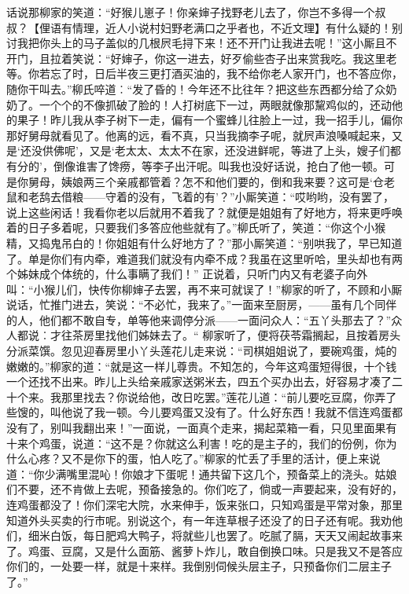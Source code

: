 \documentclass[12pt,oneside]{book}
\begin{document}
话说那柳家的笑道：“好猴儿崽子！你亲婶子找野老儿去了，你岂不多得一个叔叔？【俚语有情理，近人小说村妇野老满口之乎者也，不近文理】有什么疑的！别讨我把你头上的马子盖似的几根屄毛挦下来！还不开门让我进去呢！”这小厮且不开门，且拉着笑说：“好婶子，你这一进去，好歹偷些杏子出来赏我吃。我这里老等。你若忘了时，日后半夜三更打酒买油的，我不给你老人家开门，也不答应你，随你干叫去。”柳氏啐道︰“发了昏的！今年还不比往年？把这些东西都分给了众奶奶了。一个个的不像抓破了脸的！人打树底下一过，两眼就像那黧鸡似的，还动他的果子！昨儿我从李子树下一走，偏有一个蜜蜂儿往脸上一过，我一招手儿，偏你那好舅母就看见了。他离的远，看不真，只当我摘李子呢，就屄声浪嗓喊起来，又是‘还没供佛呢’，又是‘老太太、太太不在家，还没进鲜呢，等进了上头，嫂子们都有分的’，倒像谁害了馋痨，等李子出汗呢。叫我也没好话说，抢白了他一顿。可是你舅母，姨娘两三个亲戚都管着？怎不和他们要的，倒和我来要？这可是‘仓老鼠和老鸹去借粮——守着的没有，飞着的有’？”小厮笑道：“哎哟哟，没有罢了，说上这些闲话！我看你老以后就用不着我了？就便是姐姐有了好地方，将来更呼唤着的日子多着呢，只要我们多答应他些就有了。”柳氏听了，笑道：“你这个小猴精，又捣鬼吊白的！你姐姐有什么好地方了？”那小厮笑道：“别哄我了，早已知道了。单是你们有内牵，难道我们就没有内牵不成？我虽在这里听哈，里头却也有两个姊妹成个体统的，什么事瞒了我们！”
正说着，只听门内又有老婆子向外叫：“小猴儿们，快传你柳婶子去罢，再不来可就误了！”柳家的听了，不顾和小厮说话，忙推门进去，笑说：“不必忙，我来了。”一面来至厨房，——虽有几个同伴的人，他们都不敢自专，单等他来调停分派——一面问众人：“五丫头那去了？”众人都说︰才往茶房里找他们姊妹去了。“
柳家听了，便将茯苓霜搁起，且按着房头分派菜馔。忽见迎春房里小丫头莲花儿走来说：“司棋姐姐说了，要碗鸡蛋，炖的嫩嫩的。”柳家的道：“就是这一样儿尊贵。不知怎的，今年这鸡蛋短得很，十个钱一个还找不出来。昨儿上头给亲戚家送粥米去，四五个买办出去，好容易才凑了二十个来。我那里找去？你说给他，改日吃罢。”莲花儿道：“前儿要吃豆腐，你弄了些馊的，叫他说了我一顿。今儿要鸡蛋又没有了。什么好东西！我就不信连鸡蛋都没有了，别叫我翻出来！”一面说，一面真个走来，揭起菜箱一看，只见里面果有十来个鸡蛋，说道：“这不是？你就这么利害！吃的是主子的，我们的份例，你为什么心疼？又不是你下的蛋，怕人吃了。”柳家的忙丢了手里的活计，便上来说道：“你少满嘴里混吣！你娘才下蛋呢！通共留下这几个，预备菜上的浇头。姑娘们不要，还不肯做上去呢，预备接急的。你们吃了，倘或一声要起来，没有好的，连鸡蛋都没了！你们深宅大院，水来伸手，饭来张口，只知鸡蛋是平常对象，那里知道外头买卖的行市呢。别说这个，有一年连草根子还没了的日子还有呢。我劝他们，细米白饭，每日肥鸡大鸭子，将就些儿也罢了。吃腻了膈，天天又闹起故事来了。鸡蛋、豆腐，又是什么面筋、酱萝卜炸儿，敢自倒换口味。只是我又不是答应你们的，一处要一样，就是十来样。我倒别伺候头层主子，只预备你们二层主子了。”
\end{document}
